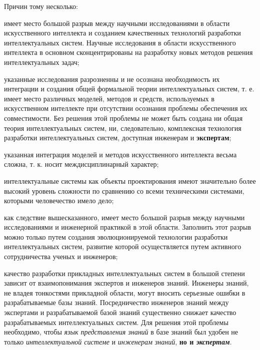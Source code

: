 \begin{SCn}
{Причин тому несколько:
\begin{scnitemize}
    \item имеет место большой разрыв между научными исследованиями в области искусственного интеллекта и созданием качественных технологий разработки интеллектуальных систем. Научные исследования в области искусственного интеллекта в основном сконцентрированы на разработку новых методов решения интеллектуальных задач;
    \item указанные исследования разрозненны и не осознана необходимость их интеграции и создания общей формальной теории интеллектуальных систем, т. е. имеет место  различных моделей, методов и средств, используемых в искусственном интеллекте при отсутствии осознания проблемы обеспечения их совместимости. Без решения этой проблемы не может быть создана ни общая теория интеллектуальных систем, ни, следовательно, комплексная технология разработки интеллектуальных систем, доступная инженерам и \textbf{экспертам};
    \item указанная интеграция моделей и методов искусственного интеллекта весьма сложна, т. к. носит междисциплинарный характер;
    \item интеллектуальные системы как объекты проектирования имеют значительно более высокий уровень сложности по сравнению со всеми техническими системами, которыми человечество имело дело;
    \item как следствие вышесказанного, имеет место большой разрыв между научными исследованиями и инженерной практикой в этой области. Заполнить этот разрыв можно только путем создания эволюционируемой технологии разработки интеллектуальных систем, развитие которой осуществляется путем активного сотрудничества ученых и инженеров;
    \item качество разработки прикладных интеллектуальных систем в большой степени зависит от взаимопонимания экспертов и инженеров знаний. Инженеры знаний, не владея тонкостями прикладной области, могут вносить серьезные ошибки в разрабатываемые базы знаний. Посредничество инженеров знаний между экспертами и разрабатываемой базой знаний существенно снижает качество разрабатываемых интеллектуальных систем. Для решения этой проблемы необходимо, чтобы \textit{язык представления знаний} в базе знаний был удобен не только \textit{интеллектуальной системе} и \textit{инженерам знаний}, \textbf{но и \textit{экспертам}}.
    
\end{scnitemize}

}
\end{SCn}
